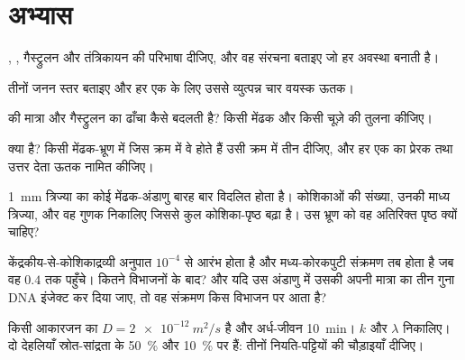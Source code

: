 \section{अभ्यास}

\begin{exercise}[$\star$]\label{exo:b2:vertebrate-development:1}
, , गैस्ट्रुलन और तंत्रिकायन की परिभाषा दीजिए, और
वह संरचना बताइए जो हर अवस्था बनाती है।
\end{exercise}

\begin{exercise}[$\star$]\label{exo:b2:vertebrate-development:2}
तीनों जनन स्तर बताइए और हर एक के लिए उससे व्युत्पन्न चार वयस्क ऊतक।
\end{exercise}

\begin{exercise}[$\star$]\label{exo:b2:vertebrate-development:3}
 की मात्रा  और गैस्ट्रुलन का ढाँचा कैसे बदलती
है? किसी मेंढक और किसी चूज़े की तुलना कीजिए।
\end{exercise}

\begin{exercise}[$\star$]\label{exo:b2:vertebrate-development:4}
 क्या है? किसी मेंढक-भ्रूण में जिस क्रम में वे होते हैं उसी क्रम
में तीन  दीजिए, और हर एक का प्रेरक तथा उत्तर देता ऊतक नामित कीजिए।
\end{exercise}

\begin{exercise}[$\star\star$]\label{exo:b2:vertebrate-development:5}
\qty{1}{mm} त्रिज्या का कोई मेंढक-अंडाणु बारह बार विदलित होता है।
कोशिकाओं की संख्या, उनकी माध्य त्रिज्या, और वह गुणक निकालिए जिससे
कुल कोशिका-पृष्ठ बढ़ा है। उस भ्रूण को वह अतिरिक्त पृष्ठ क्यों चाहिए?
\end{exercise}

\begin{exercise}[$\star\star$]\label{exo:b2:vertebrate-development:6}
केंद्रकीय-से-कोशिकाद्रव्यी अनुपात $10^{-4}$ से आरंभ होता है और
मध्य-कोरकपुटी संक्रमण तब होता है जब वह $0.4$ तक पहुँचे। कितने
विभाजनों के बाद? और यदि उस अंडाणु में उसकी अपनी मात्रा का तीन गुना DNA
इंजेक्ट कर दिया जाए, तो वह संक्रमण किस विभाजन पर आता है?
\end{exercise}

\begin{exercise}[$\star\star$]\label{exo:b2:vertebrate-development:7}
किसी आकारजन का $D = \qty{2e-12}{m^2/s}$ है और अर्ध-जीवन
\qty{10}{min}। $k$ और $\lambda$ निकालिए। दो देहलियाँ स्रोत-सांद्रता के
\qty{50}{\%} और \qty{10}{\%} पर हैं: तीनों नियति-पट्टियों की
चौड़ाइयाँ दीजिए।
\end{exercise}

